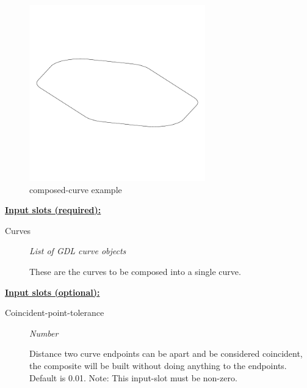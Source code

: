 \documentclass [11pt]{book}
\begin{document}
\begin{itemize}
\begin{figure}
\begin{center}
\includegraphics[width=3in,height=3in]{../images/example-composed-curve.pdf}
\end{center}

\caption{composed-curve example}

\label{fig:composed-curve}

\end{figure}





\textbf{
\underline{Input slots (required):}}

\begin{description}

\item [Curves]
\emph{List of GDL curve objects}

 These are the curves to be composed into a single curve.




\end{description}






\textbf{
\underline{Input slots (optional):}}

\begin{description}

\item [Coincident-point-tolerance]
\emph{Number}

 Distance two curve endpoints can be apart and be considered coincident, the composite will be built
without doing anything to the endpoints. Default is 0.01. Note: This input-slot must be non-zero.





\end{description}
\end{itemize}
\end{document}
